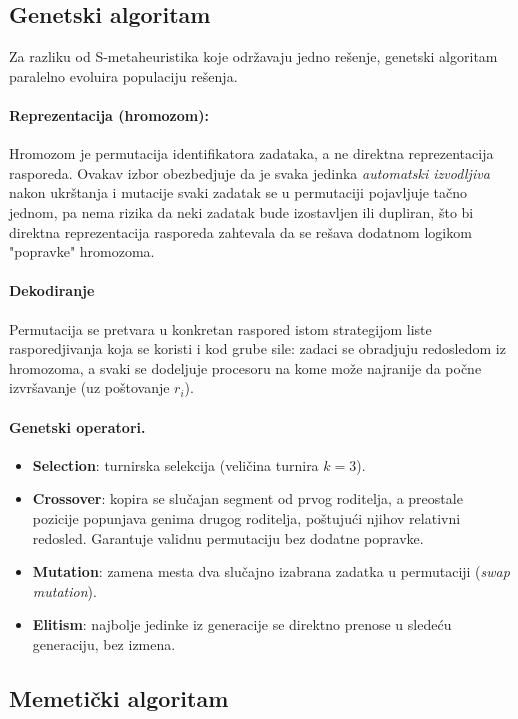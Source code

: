 \documentclass{article}
\begin{document}
\subsection{Genetski algoritam}

Za razliku od S-metaheuristika koje održavaju jedno rešenje, genetski
algoritam paralelno evoluira populaciju rešenja.

\paragraph{Reprezentacija (hromozom):} Hromozom je permutacija
identifikatora zadataka, a ne direktna reprezentacija rasporeda. Ovakav
izbor obezbedjuje da je svaka jedinka \emph{automatski izvodljiva} nakon
ukrštanja i mutacije svaki zadatak se u permutaciji pojavljuje tačno
jednom, pa nema rizika da neki zadatak bude izostavljen ili dupliran, što bi
direktna reprezentacija rasporeda zahtevala da se rešava dodatnom logikom
"popravke" hromozoma.

\paragraph{Dekodiranje} Permutacija se pretvara u konkretan raspored istom
strategijom liste rasporedjivanja koja se koristi i kod grube sile: zadaci se
obradjuju redosledom iz hromozoma, a svaki se dodeljuje procesoru na kome
može najranije da počne izvršavanje (uz poštovanje $r_i$).

\paragraph{Genetski operatori.}
\begin{itemize}
    \item \textbf{Selection}: turnirska selekcija (veličina turnira $k=3$).
    \item \textbf{Crossover}: kopira se slučajan segment od prvog roditelja, a preostale
        pozicije popunjava genima drugog roditelja, poštujući njihov
        relativni redosled. Garantuje validnu permutaciju bez dodatne
        popravke.
    \item \textbf{Mutation}: zamena mesta dva slučajno izabrana zadatka u
        permutaciji (\textit{swap mutation}).
    \item \textbf{Elitism}: najbolje jedinke iz generacije se direktno
        prenose u sledeću generaciju, bez izmena.
\end{itemize}
\newpage
\subsection{Memetički algoritam}
\end{document}
